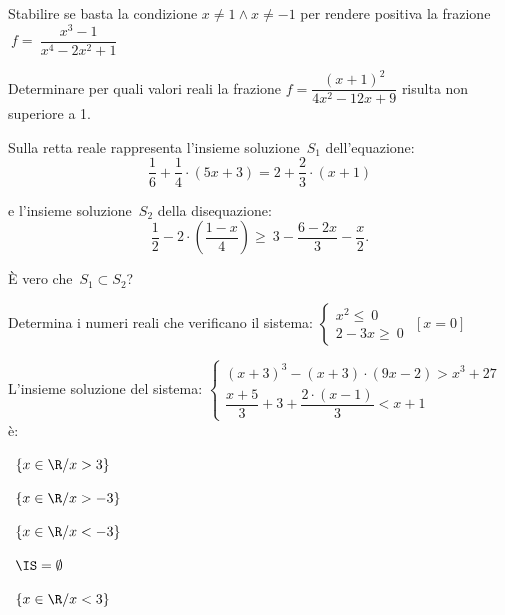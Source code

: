 \begin{esercizio}
 \label{ese:4.73}
Stabilire se basta la condizione \(x\neq 1\wedge x\neq -1\) per rendere 
positiva 
la frazione \(~f=~\dfrac{x^3-1}{x^4-2x^2+1}\)
\end{esercizio}

\begin{esercizio}
 \label{ese:4.74}
Determinare per quali valori reali la frazione 
\(f=\dfrac{(x+1)^2}{4x^2-12x+9}\) 
risulta non superiore a 1.
\end{esercizio}


\begin{esercizio}
 \label{ese:21.33}
Sulla retta reale rappresenta l'insieme soluzione~\(S_{1}\)
dell'equazione:
\[\dfrac{1}{6}+\dfrac{1}{4}\cdot (5x+3)=2+\dfrac{2}{3}\cdot (x+1)\]

e l'insieme soluzione~\(S_{2}\) della disequazione:
\[\dfrac{1}{2}-2\cdot\left(\dfrac{1-x}{4}\right)\ge~3-\dfrac{6-2x}{3}-\dfrac{x
}{2}.\]

È vero che~\(S_{1}\subset S_{2}\)?
\end{esercizio}

\begin{esercizio}[*]
 \label{ese:21.34}
 Determina i numeri reali che verificano il sistema:
 \(\left\{%
  \begin{array}{l}
  x^{2}\le~0
  \\2-3x\ge~0
 \end{array}\right.\)
\hfill \(\left[x = 0\right]\)
 \end{esercizio}

\begin{esercizio}
 \label{ese:21.35}
 L'insieme soluzione del sistema:
\(\left\{\begin{array}{l}
  (x+3)^{3}-(x+3)\cdot (9x-2)>x^{3}+27\\
  \dfrac{x+5}{3}+3+\dfrac{2\cdot (x-1)}{3}<x+1
 \end{array}\right.\) è:
\begin{htmulticols}{2}
\quad~\(\left\{x\in \R/x>3\right\}\)

\quad~\(\left\{x\in \R/x>-3\right\}\)

\quad~\(\left\{x\in \R/x<-3\right\}\)

\quad~\(\IS=\emptyset \)

\quad~\(\left\{x\in\R/x<3\right\}\)
\end{htmulticols}

\end{esercizio}

